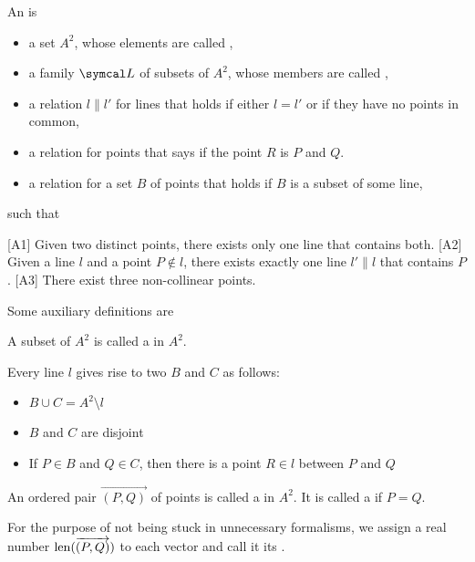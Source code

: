 \begin{definition}\label{def:affine_plane}\cite[1]{Hartshorne1967}
  An  is
  \begin{itemize}
    \item a set \( A^2 \), whose elements are called ,
    \item a family \( \Cal{L} \) of subsets of \( A^2 \), whose members are called ,
    \item a  relation \( l \parallel l' \) for lines that holds if either \( l = l' \) or if they have no points in common,
    \item a  relation for points that says if the point \( R \) is  \( P \) and \( Q \).
    \item a  relation for a set \( B \) of points that holds if \( B \) is a subset of some line,
  \end{itemize}
  such that
  \begin{defenum}
    [A1] Given two distinct points, there exists only one line that contains both.
    [A2] Given a line \( l \) and a point \( P \not\in l \), there exists exactly one line \( l' \parallel l \) that contains \( P \).
    [A3] There exist three non-collinear points.
  \end{defenum}

  Some auxiliary definitions are
  \begin{defenum}
     A subset of \( A^2 \) is called a  in \( A^2 \).

     Every line \( l \) gives rise to two  \( B \) and \( C \) as follows:
    \begin{itemize}
      \item \( B \cup C = A^2 \setminus l \)
      \item \( B \) and \( C \) are disjoint
      \item If \( P \in B \) and \( Q \in C \), then there is a point \( R \in l \) between \( P \) and \( Q \)
    \end{itemize}

     An ordered pair \( \Vec{(P, Q)} \) of points is called a  in \( A^2 \). It is called a  if \( P = Q \).

     For the purpose of not being stuck in unnecessary formalisms, we assign a real number \( \operatorname{len}(\overrightarrow{(P, Q)}) \) to each vector and call it its .
  \end{defenum}
\end{definition}

